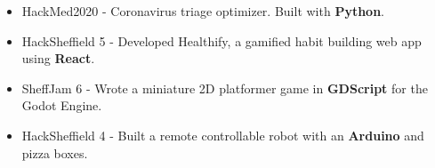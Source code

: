 \documentclass[11pt,a4paper,sans]{moderncv}
\begin{document}
\vspace{0.1cm}

{\vspace{-1.0em}}{
\begin{itemize}
    \item HackMed2020 - Coronavirus triage optimizer. Built with \textbf{Python}.
    \item HackSheffield 5 - Developed Healthify, a gamified habit building web app using     \textbf{React}.
    \item SheffJam 6 - Wrote a miniature 2D platformer game in \textbf{GDScript} for the Godot Engine.
    \item HackSheffield 4 - Built a remote controllable robot with an \textbf{Arduino} and pizza boxes.
\end{itemize}}
\end{document}
